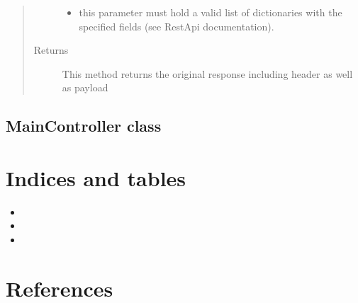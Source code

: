 \documentclass[letterpaper,10pt,english,openany,oneside]{sphinxmanual}
\begin{document}
\begin{fulllineitems}
\begin{fulllineitems}
\begin{quote}
\begin{description}
\begin{itemize}
\item {} 
 \textendash{} this parameter must hold a valid list of dictionaries with the specified fields (see RestApi documentation).

\end{itemize}

\item[{Returns}] \leavevmode
This method returns the original response including header as well as payload

\end{description}\end{quote}

\end{fulllineitems}


\end{fulllineitems}



\section{MainController class}
\label{\detokenize{MainController:maincontroller-class}}\label{\detokenize{MainController::doc}}

\chapter{Indices and tables}
\label{\detokenize{index:indices-and-tables}}\begin{itemize}
\item {} 

\item {} 

\item {} 

\end{itemize}


\chapter{References}
\label{\detokenize{index:references}}


\renewcommand{\indexname}{Index}
\printindex
\end{document}
